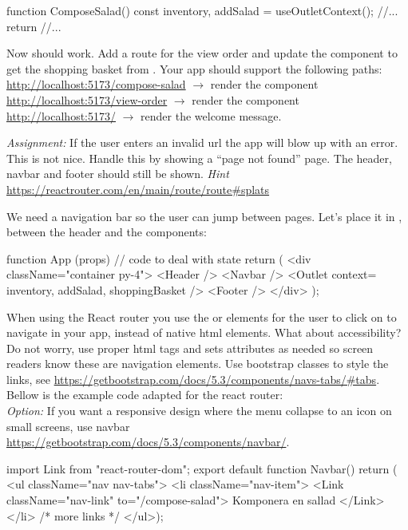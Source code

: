 \documentclass[fleqn, article, a4paper]{memoir}
\begin{document}
\begin{Assignments}
\begin{Code}
function ComposeSalad() {
  const { inventory, addSalad } = useOutletContext();
  //...
  return //...
}
\end{Code}
Now  should work. Add a route for the view order and update the component to get the shopping basket from . Your app should support the following paths:
\\ \url{http://localhost:5173/compose-salad} $\rightarrow$ render the  component
\\ \url{http://localhost:5173/view-order} $\rightarrow$ render the  component
\\ \url{http://localhost:5173/} $\rightarrow$ render the welcome message.

\emph{Assignment:} If the user enters an invalid url the app will blow up with an error. This is not nice. Handle this by showing a ``page not found'' page. The header, navbar and footer should still be shown. \emph{Hint} \url{https://reactrouter.com/en/main/route/route#splats}

\item We need a navigation bar so the user can jump between pages. Let's place it in , between the header and the  components:

\begin{Code}
function App (props) {
  // code to deal with state
  return (
    <div className="container py-4">
        <Header />
        <Navbar />
        <Outlet context={{ inventory, addSalad, shoppingBasket }} />
        <Footer />
    </div>
  );
}
\end{Code}

\noindent When using the React router you use the  or  elements for the user to click on to navigate in your app, instead of native  html elements. What about accessibility? Do not worry,  use proper html tags and sets  attributes as needed so screen readers know these are navigation elements. Use bootstrap classes to style the links, see \url{https://getbootstrap.com/docs/5.3/components/navs-tabs/#tabs}. Bellow is the example code adapted for the react router:
\\ \emph{Option:} If you want a responsive design where the menu collapse to an icon on small screens, use navbar \url{https://getbootstrap.com/docs/5.3/components/navbar/}.

\begin{Code}
import { Link } from "react-router-dom";
export default function Navbar() {
  return (
  <ul className="nav nav-tabs">
    <li className="nav-item">
      <Link className="nav-link" to="/compose-salad">
        Komponera en sallad
      </Link>
    </li>
    {/* more links */}
  </ul>);
}
\end{Code}


\end{Assignments}
\end{document}
